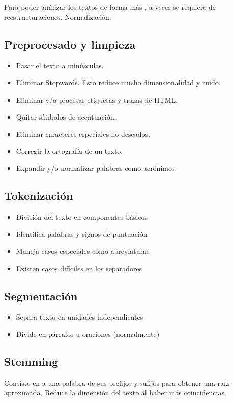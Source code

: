 \documentclass{report}
\begin{document}
Para poder análizar los textos de forma más , a veces se requiere de reestructuraciones. Normalización:

\subsection{Preprocesado y limpieza}
\begin{itemize}
    \item Pasar el texto a minúsculas.
    \item Eliminar Stopwords. 
    Esto reduce mucho dimensionalidad y ruido.
    \item Eliminar y/o procesar etiquetas y trazas de HTML.
    \item Quitar símbolos de acentuación.
    \item Eliminar caracteres especiales no deseados.
    \item Corregir la ortografía de un texto.
    \item Expandir y/o normalizar palabras  como acrónimos.
\end{itemize}

\subsection {Tokenización}

\begin{itemize}
    \item División del texto en componentes básicos
    \item Identifica palabras y signos de   puntuación
    \item Maneja casos especiales como abreviaturas
    \item Existen casos difíciles en  los separadores
\end{itemize}

\subsection{Segmentación}
\begin{itemize}
    \item Separa texto en unidades independientes
    \item Divide en párrafos u oraciones (normalmente)
\end{itemize}

\subsection{Stemming}
Consiste en  a una palabra de sus  prefijos y sufijos para obtener una raíz aproximada. Reduce la dimensión del texto al haber más coincidencias.
\end{document}
